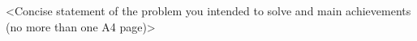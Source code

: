 <Concise statement of the problem you intended to solve and main achievements (no more than one A4 page)>
